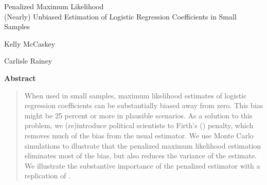 \documentclass[12pt]{article}
\begin{document}
\begin{center}
{\Large Penalized Maximum Likelihood}\\\vspace{2mm}
{\normalsize (Nearly) Unbiased Estimation of Logistic Regression Coefficients in Small Samples}\\\vspace{2mm}


\vspace{10mm}

Kelly McCaskey

\vspace{3mm}

Carlisle Rainey
\end{center}

\vspace{10mm}

{\centerline{\textbf{Abstract}}}
\begin{quote}\noindent
When used in small samples, maximum likelihood estimates of logistic regression coefficients can be substantially biased away from zero. 
This bias might be 25 percent or more in plausible scenarios. 
As a solution to this problem, we (re)introduce political scientists to Firth's (\citeyear{Firth1993}) penalty, which removes much of the bias from the usual estimator. 
We use Monte Carlo simulations to illustrate that the penalized maximum likelihood estimation eliminates most of the bias, but also reduces the variance of the estimate. 
We illustrate the substantive importance of the penalized estimator with a replication of \cite{Weisiger2014}.
 \end{quote}


\thispagestyle{empty}

\newpage
\doublespace
\end{document}
